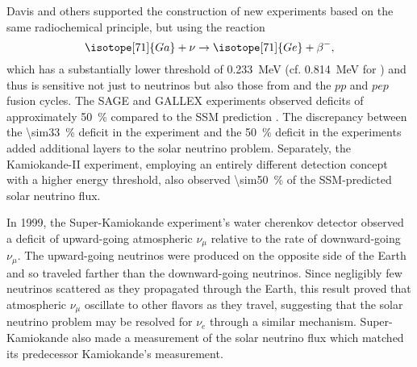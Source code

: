 Davis and others supported the construction of
new experiments based on the same radiochemical principle,
but using the reaction
\begin{equation}\label{eq:gallium}
    \isotope[71]{Ga} + \nu \to \isotope[71]{Ge} + \beta^-,
\end{equation}
which has a substantially lower threshold
of \SI{0.233}{\MeV} (cf. \SI{0.814}{\MeV} for )
and thus is sensitive not just to  neutrinos
but also those from  and the $pp$ and $pep$ fusion cycles.
The SAGE and GALLEX experiments observed deficits of approximately \SI{50}{\percent}
compared to the SSM prediction \cite{sage,gallex}.
The discrepancy between the \SI{\sim33}{\percent} deficit
in the  experiment
and the \SI{50}{\percent} deficit in the  experiments
added additional layers to the solar neutrino problem.
Separately, the Kamiokande-II experiment,
employing an entirely different detection concept
with a higher energy threshold,
also observed \SI{\sim50}{\percent} of the SSM-predicted solar neutrino flux.

In 1999, the Super-Kamiokande experiment's water cherenkov detector
observed a deficit of upward-going atmospheric $\nu_\mu$
relative to the rate of downward-going $\nu_\mu$.
The upward-going neutrinos were produced on the opposite side of the Earth
and so traveled farther than the downward-going neutrinos.
Since negligibly few neutrinos scattered as they propagated through the Earth,
this result proved that atmospheric $\nu_\mu$ oscillate to other flavors
as they travel,
suggesting that the solar neutrino problem may be resolved for $\nu_e$
through a similar mechanism. 
Super-Kamiokande also made a measurement of the solar neutrino flux
which matched its predecessor Kamiokande's measurement.

